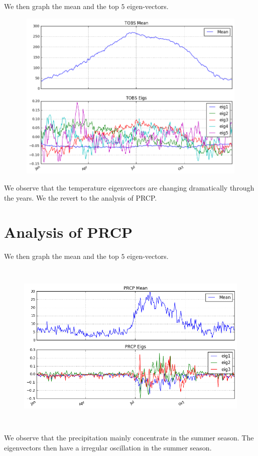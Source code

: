 \documentclass{article}
\begin{document}
We then graph the mean and the top $5$ eigen-vectors.

\begin{figure}[H]
\centering
\includegraphics[width=15cm,height=8.17cm]{../figures/4_1_mean_eigen_vector}
\end{figure}

We observe that the temperature eigenvectors are changing dramatically through the years. We the revert to the analysis of PRCP. \\



\section*{Analysis of PRCP}

We then graph the mean and the top $5$ eigen-vectors.

\begin{figure}[H]
\centering
\includegraphics[width=15cm,height=8.17cm]{../figures/5_1_mean_eigen_vector}
\end{figure}

We observe that the precipitation mainly concentrate in the summer season. The eigenvectors then have a irregular oscillation in the summer season.\\



\end{document}
